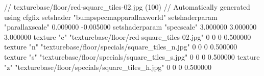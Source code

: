 // texturebase/floor/red-square_tiles-02.jpg (100)
// Automatically generated using cfgfix
setshader "bumpspecmapparallaxworld"
setshaderparam "parallaxscale" 0.009000 -0.005000
setshaderparam "specscale" 3.000000 3.000000 3.000000
texture "c" "texturebase/floor/red-square_tiles-02.jpg" 0 0 0 0.500000
texture "n" "texturebase/floor/specials/square_tiles_n.jpg" 0 0 0 0.500000
texture "s" "texturebase/floor/specials/square_tiles_s.jpg" 0 0 0 0.500000
texture "z" "texturebase/floor/specials/square_tiles_h.jpg" 0 0 0 0.500000

